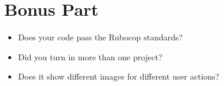 \documentclass{42-en}
\begin{document}

\chapter{Bonus Part}

\begin{itemize}
\item Does your code pass the Rubocop standards?
\item Did you turn in more than one project?
\item Does it show different images for different user actions?
\end{itemize}

\end{document}
